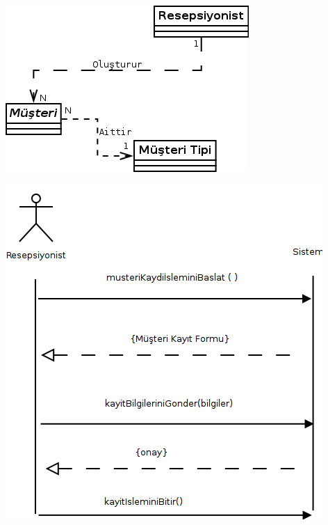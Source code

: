 \documentclass[12pt,a4paper]{report}
\begin{document}
\begin{center}
\includegraphics{dia/usecase1.png}
\end{center}

\newpage

\begin{center}
\includegraphics{dia/ssd-usecase1.png}
\end{center}
\end{document}
